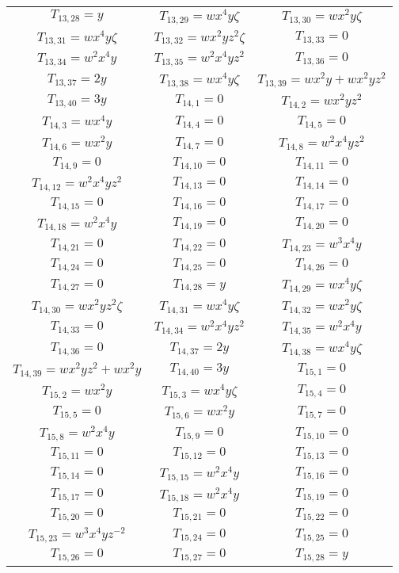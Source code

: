 \documentclass[12pt]{memoireuqam1.3}
\begin{document}
\begin{longtable}{|c|c|c|}
$T_{13,28}= y$&
$T_{13,29}= wx^4y\zeta$&
$T_{13,30}= wx^2y\zeta$\\
$T_{13,31}= wx^4y\zeta$&
$T_{13,32}= wx^2yz^2\zeta$&
$T_{13,33}= 0$\\
$T_{13,34}= w^2x^4y$&
$T_{13,35}= w^2x^4yz^2$&
$T_{13,36}= 0$\\
$T_{13,37}= 2y$&
$T_{13,38}= wx^4y\zeta$&
$T_{13,39}= wx^2y+wx^2yz^2$\\
$T_{13,40}= 3y$&
$T_{14,1}= 0$&
$T_{14,2}= wx^2yz^2$\\
$T_{14,3}= wx^4y$&
$T_{14,4}= 0$&
$T_{14,5}= 0$\\
$T_{14,6}= wx^2y$&
$T_{14,7}= 0$&
$T_{14,8}= w^2x^4yz^2$\\
$T_{14,9}= 0$&
$T_{14,10}= 0$&
$T_{14,11}= 0$\\
$T_{14,12}= w^2x^4yz^2$&
$T_{14,13}= 0$&
$T_{14,14}= 0$\\
$T_{14,15}= 0$&
$T_{14,16}= 0$&
$T_{14,17}= 0$\\
$T_{14,18}= w^2x^4y$&
$T_{14,19}= 0$&
$T_{14,20}= 0$\\
$T_{14,21}= 0$&
$T_{14,22}= 0$&
$T_{14,23}= w^3x^4y$\\
$T_{14,24}= 0$&
$T_{14,25}= 0$&
$T_{14,26}= 0$\\
$T_{14,27}= 0$&
$T_{14,28}= y$&
$T_{14,29}= wx^4y\zeta$\\
$T_{14,30}= wx^2yz^2\zeta$&
$T_{14,31}= wx^4y\zeta$&
$T_{14,32}= wx^2y\zeta$\\
$T_{14,33}= 0$&
$T_{14,34}= w^2x^4yz^2$&
$T_{14,35}= w^2x^4y$\\
$T_{14,36}= 0$&
$T_{14,37}= 2y$&
$T_{14,38}= wx^4y\zeta$\\
$T_{14,39}= wx^2yz^2+wx^2y$&
$T_{14,40}= 3y$&
$T_{15,1}= 0$\\
$T_{15,2}= wx^2y$&
$T_{15,3}= wx^4y\zeta$&
$T_{15,4}= 0$\\
$T_{15,5}= 0$&
$T_{15,6}= wx^2y$&
$T_{15,7}= 0$\\
$T_{15,8}= w^2x^4y$&
$T_{15,9}= 0$&
$T_{15,10}= 0$\\
$T_{15,11}= 0$&
$T_{15,12}= 0$&
$T_{15,13}= 0$\\
$T_{15,14}= 0$&
$T_{15,15}= w^2x^4y$&
$T_{15,16}= 0$\\
$T_{15,17}= 0$&
$T_{15,18}= w^2x^4y$&
$T_{15,19}= 0$\\
$T_{15,20}= 0$&
$T_{15,21}= 0$&
$T_{15,22}= 0$\\
$T_{15,23}= w^3x^4yz^{-2}$&
$T_{15,24}= 0$&
$T_{15,25}= 0$\\
$T_{15,26}= 0$&
$T_{15,27}= 0$&
$T_{15,28}= y$\\

\end{longtable}
\end{document}
